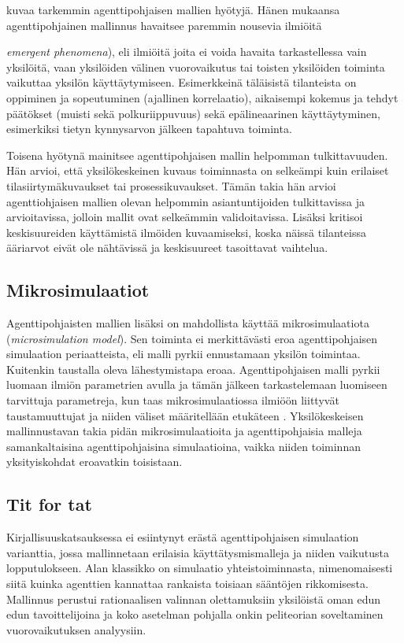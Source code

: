 \documentclass[finnish,gradu,twoside,12pt]{tktltiki}
\begin{document}
\citet{Bonabeau2002} kuvaa tarkemmin agenttipohjaisen mallien hyötyjä. Hänen mukaansa agenttipohjainen mallinnus havaitsee paremmin nousevia ilmiöitä {\textit{emergent phenomena}), eli ilmiöitä joita ei voida havaita tarkastellessa vain yksilöitä, vaan yksilöiden välinen vuorovaikutus tai toisten yksilöiden toiminta vaikuttaa yksilön käyttäytymiseen. Esimerkkeinä täläisistä tilanteista on oppiminen ja sopeutuminen (ajallinen korrelaatio), aikaisempi kokemus ja tehdyt päätökset (muisti sekä polkuriippuvuus) sekä epälineaarinen käyttäytyminen, esimerkiksi tietyn kynnysarvon jälkeen tapahtuva toiminta.

Toisena hyötynä \citet{Bonabeau2002} mainitsee agenttipohjaisen mallin helpomman tulkittavuuden. Hän arvioi, että yksilökeskeinen kuvaus toiminnasta on selkeämpi kuin erilaiset tilasiirtymäkuvaukset tai prosessikuvaukset. Tämän takia hän arvioi agenttiohjaisen mallien olevan helpommin asiantuntijoiden tulkittavissa ja arvioitavissa, jolloin mallit ovat selkeämmin validoitavissa. Lisäksi \citet{Bonabeau2002} kritisoi keskisuureiden käyttämistä ilmöiden kuvaamiseksi, koska näissä tilanteissa ääriarvot eivät ole nähtävissä ja keskisuureet tasoittavat vaihtelua.

\subsection{Mikrosimulaatiot}

Agenttipohjaisten mallien lisäksi on mahdollista käyttää mikrosimulaatiota  (\textit{microsimulation model}). Sen toiminta ei merkittävästi eroa agenttipohjaisen simulaation periaatteista, eli malli pyrkii ennustamaan yksilön toimintaa. Kuitenkin taustalla oleva lähestymistapa eroaa. Agenttipohjaisen malli pyrkii luomaan ilmiön parametrien avulla ja tämän jälkeen tarkastelemaan luomiseen tarvittuja parametreja, kun taas mikrosimulaatiossa ilmiöön liittyvät taustamuuttujat ja niiden väliset määritellään etukäteen \citep[58--59]{Gilbert2005}. Yksilökeskeisen mallinnustavan takia pidän mikrosimulaatioita ja agenttipohjaisia malleja samankaltaisina agenttipohjaisina simulaatioina, vaikka niiden toiminnan yksityiskohdat eroavatkin toisistaan.

\subsection{Tit for tat}

Kirjallisuuskatsauksessa ei esiintynyt erästä agenttipohjaisen simulaation varianttia, jossa mallinnetaan erilaisia käyttätysmismalleja ja niiden vaikutusta lopputulokseen. Alan klassikko on \citet{Axelrod01031980} simulaatio yhteistoiminnasta, nimenomaisesti siitä kuinka agenttien kannattaa rankaista toisiaan sääntöjen rikkomisesta. Mallinnus perustui rationaalisen valinnan olettamuksiin yksilöistä oman edun edun tavoittelijoina ja koko asetelman pohjalla onkin peliteorian soveltaminen vuorovaikutuksen analyysiin.

}
\end{document}
